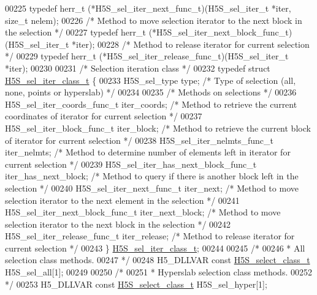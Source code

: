 \begin{DoxyCode}
00225 \textcolor{keyword}{typedef} herr\_t (*H5S\_sel\_iter\_next\_func\_t)(H5S\_sel\_iter\_t *iter, \textcolor{keywordtype}{size\_t} nelem);
00226 \textcolor{comment}{/* Method to move selection iterator to the next block in the selection */}
00227 \textcolor{keyword}{typedef} herr\_t (*H5S\_sel\_iter\_next\_block\_func\_t)(H5S\_sel\_iter\_t *iter);
00228 \textcolor{comment}{/* Method to release iterator for current selection */}
00229 \textcolor{keyword}{typedef} herr\_t (*H5S\_sel\_iter\_release\_func\_t)(H5S\_sel\_iter\_t *iter);
00230 
00231 \textcolor{comment}{/* Selection iteration class */}
00232 \textcolor{keyword}{typedef} \textcolor{keyword}{struct }\hyperlink{struct_h5_s__sel__iter__class__t}{H5S\_sel\_iter\_class\_t} \{
00233     H5S\_sel\_type type;                          \textcolor{comment}{/* Type of selection (all, none, points or hyperslab) */}
00234 
00235     \textcolor{comment}{/* Methods on selections */}
00236     H5S\_sel\_iter\_coords\_func\_t iter\_coords;     \textcolor{comment}{/* Method to retrieve the current coordinates of iterator
       for current selection */}
00237     H5S\_sel\_iter\_block\_func\_t iter\_block;       \textcolor{comment}{/* Method to retrieve the current block of iterator for
       current selection */}
00238     H5S\_sel\_iter\_nelmts\_func\_t iter\_nelmts;     \textcolor{comment}{/* Method to determine number of elements left in iterator
       for current selection */}
00239     H5S\_sel\_iter\_has\_next\_block\_func\_t iter\_has\_next\_block;         \textcolor{comment}{/* Method to query if there is another
       block left in the selection */}
00240     H5S\_sel\_iter\_next\_func\_t iter\_next;         \textcolor{comment}{/* Method to move selection iterator to the next element in
       the selection */}
00241     H5S\_sel\_iter\_next\_block\_func\_t iter\_next\_block;     \textcolor{comment}{/* Method to move selection iterator to the next
       block in the selection */}
00242     H5S\_sel\_iter\_release\_func\_t iter\_release;   \textcolor{comment}{/* Method to release iterator for current selection */}
00243 \} \hyperlink{struct_h5_s__sel__iter__class__t}{H5S\_sel\_iter\_class\_t};
00244 
00245 \textcolor{comment}{/*}
00246 \textcolor{comment}{ * All selection class methods.}
00247 \textcolor{comment}{ */}
00248 H5\_DLLVAR \textcolor{keyword}{const} \hyperlink{struct_h5_s__select__class__t}{H5S\_select\_class\_t} H5S\_sel\_all[1];
00249 
00250 \textcolor{comment}{/*}
00251 \textcolor{comment}{ * Hyperslab selection class methods.}
00252 \textcolor{comment}{ */}
00253 H5\_DLLVAR \textcolor{keyword}{const} \hyperlink{struct_h5_s__select__class__t}{H5S\_select\_class\_t} H5S\_sel\_hyper[1];

\end{DoxyCode}
